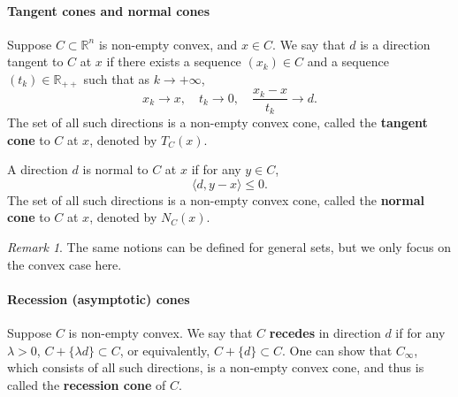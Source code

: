 \documentclass[openany]{book}
\theoremstyle{definition}
\theoremstyle{remark}
\newtheorem*{remark}{Remark}
\begin{document}
\paragraph{Tangent cones and normal cones}
Suppose $C\subset \mathbb{R}^n$ is non-empty convex, and $x\in C$. We say that $d$ is a direction tangent to $C$ at $x$ if there exists a sequence $(x_k)\in C$ and a sequence $(t_k)\in \mathbb{R}_{++}$ such that as $k\to+\infty$,
\begin{equation}
    x_k\to x,\quad t_k\to0,\quad \frac{x_k-x}{t_k}\to d.
\end{equation}
The set of all such directions is a non-empty convex cone, called the \textbf{tangent cone} to $C$ at $x$, denoted by $T_C(x)$.

A direction $d$ is normal to $C$ at $x$ if for any $y\in C$,
\begin{equation}
    \langle d,y-x\rangle\le0.
\end{equation}
The set of all such directions is a non-empty convex cone, called the \textbf{normal cone} to $C$ at $x$, denoted by $N_C(x)$.

\begin{remark}
    The same notions can be defined for general sets, but we only focus on the convex case here.
\end{remark}

\paragraph{Recession (asymptotic) cones}
Suppose $C$ is non-empty convex. We say that $C$ \textbf{recedes} in direction $d$ if for any $\lambda>0$, $C+\{\lambda d\}\subset C$, or equivalently, $C+\{d\}\subset C$. One can show that $C_{\infty}$, which consists of all such directions, is a non-empty convex cone, and thus is called the \textbf{recession cone} of $C$.
\end{document}
